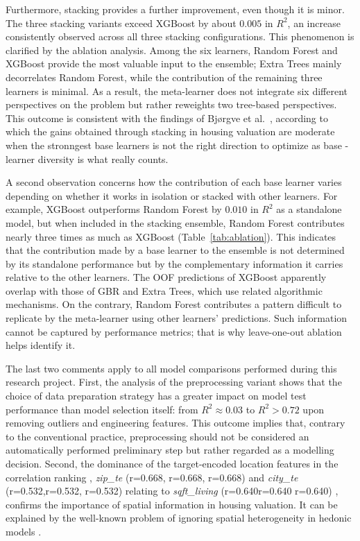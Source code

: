 \documentclass[conference]{IEEEtran}
\begin{document}
Furthermore, stacking provides a further improvement, even though it is minor. The three stacking variants exceed XGBoost by about $0.005$ in $R^{2}$, an increase consistently observed across all three stacking configurations. This phenomenon is clarified by the ablation analysis. Among the six learners, Random Forest and XGBoost provide the most valuable input to the ensemble; Extra Trees mainly decorrelates Random Forest, while the contribution of the remaining three learners is minimal. As a result, the meta-learner does not integrate six different perspectives on the problem but rather reweights two tree-based perspectives. This outcome is consistent with the findings of Bj{\o}rgve et al.~\cite{Bjrgve2025ComparingHV}, according to which the gains obtained through stacking in housing valuation are moderate when the stronngest base learners is not the right direction to optimize as base -learner diversity is what really counts. 

A second observation concerns how the contribution of each base learner varies depending on whether it works in isolation or stacked with other learners. For example, XGBoost outperforms Random Forest by $0.010$ in $R^{2}$ as a standalone model, but when included in the stacking ensemble, Random Forest contributes nearly three times as much as XGBoost (Table~\ref{tab:ablation}). This indicates that the contribution made by a base learner to the ensemble is not determined by its standalone performance but by the complementary information it carries relative to the other learners. The OOF predictions of XGBoost apparently overlap with those of GBR and Extra Trees, which use related algorithmic mechanisms. On the contrary, Random Forest contributes a pattern difficult to replicate by the meta-learner using other learners' predictions. Such information cannot be captured by performance metrics; that is why leave-one-out ablation helps identify it.

The last two comments apply to all model comparisons performed during this research project. First, the analysis of the preprocessing variant shows that the choice of data preparation strategy has a greater impact on model test performance than model selection itself: from $R^{2}\approx 0.03$ to $R^{2}>0.72$ upon removing outliers and engineering features. This outcome implies that, contrary to the conventional practice, preprocessing should not be considered an automatically performed preliminary step but rather regarded as a modelling decision. Second, the dominance of the target-encoded location features in the correlation ranking , \textit{zip\_te} (r=0.668, r=0.668, r=0.668) and \textit{city\_te} (r=0.532,r=0.532, r=0.532) relating to \textit{sqft\_living} (r=0.640r=0.640
r=0.640) , confirms the importance of spatial information in housing valuation. It can be explained by the well-known problem of ignoring spatial heterogeneity in hedonic models  \cite{SELIM20092843}.
\end{document}
